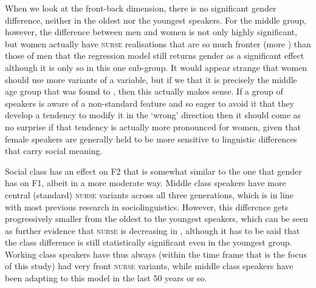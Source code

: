 When we look at the front-back dimension, there is no significant gender difference, neither in the oldest nor the youngest speakers.
For the middle group, however, the difference between men and women is not only highly significant, but women actually have \textsc{nurse} realisations that are so much fronter (more ) than those of men that the regression model still returns gender as a significant effect although it is only so in this one sub-group.
It would appear strange that women should use more  variants of a  variable, but if we  that it is precisely the middle age group that was found to , then this actually makes sense.
If a group of speakers is aware of a non-standard feature and so eager to avoid it that they develop a tendency to modify it in the `wrong' direction then it should come as no surprise if that tendency is actually more pronounced for women, given that female speakers are generally held to be more sensitive to linguistic differences that carry social meaning.

Social class has an effect on F2 that is somewhat similar to the one that gender has on F1, albeit in a more moderate way.
Middle class speakers have more central (standard) \textsc{nurse} variants across all three generations, which is in line with most previous research in sociolinguistics.
However, this difference gets progressively smaller from the oldest to the youngest speakers, which can be seen as further evidence that \textsc{nurse} is decreasing in , although it has to be said that the class difference is still statistically significant even in the youngest group.
Working class speakers have thus always (within the time frame that is the focus of this study) had very front \textsc{nurse} variants, while middle class speakers have been adapting to this model in the last 50 years or so.

